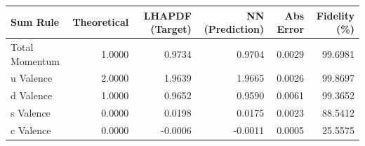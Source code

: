 \begin{tabular}{lrrrrr}
\toprule
      Sum Rule &  Theoretical &  LHAPDF (Target) &  NN (Prediction) &  Abs Error &  Fidelity (\%) \\
\midrule
Total Momentum &       1.0000 &           0.9734 &           0.9704 &     0.0029 &       99.6981 \\
     u Valence &       2.0000 &           1.9639 &           1.9665 &     0.0026 &       99.8697 \\
     d Valence &       1.0000 &           0.9652 &           0.9590 &     0.0061 &       99.3652 \\
     s Valence &       0.0000 &           0.0198 &           0.0175 &     0.0023 &       88.5412 \\
     c Valence &       0.0000 &          -0.0006 &          -0.0011 &     0.0005 &       25.5575 \\
\bottomrule
\end{tabular}
